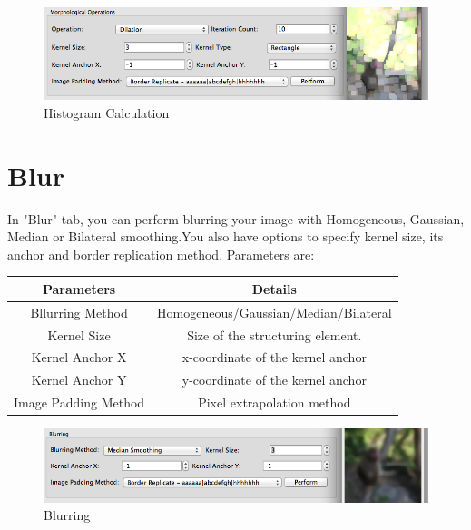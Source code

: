 \documentclass{article}
\begin{document}
\begin{figure}[H]
\begin{center}
\includegraphics[scale=0.5]{toolboxMorph.png}
\caption{Histogram Calculation}
\end{center}
\end{figure}	

\section{Blur}

In "Blur" tab, you can perform blurring your image with Homogeneous, Gaussian, Median or Bilateral smoothing.You also have options to specify kernel size, its anchor and border replication method. Parameters are:

\begin{table}[H]
\begin{center}
\begin{tabular}{|c|c|l|l|l|}
\hline
\textbf{Parameters}  & \multicolumn{4}{|c|}{\textbf{Details}}                                                          \\ \hline
Bllurring Method            & \multicolumn{4}{|c|}{Homogeneous/Gaussian/Median/Bilateral} \\ \hline
Kernel Size          & \multicolumn{4}{|c|}{Size of the structuring element.}                                          \\ \hline
Kernel Anchor X      & \multicolumn{4}{|c|}{x-coordinate of the kernel anchor}                                         \\ \hline
Kernel Anchor Y      & \multicolumn{4}{|c|}{y-coordinate of the kernel anchor}                                         \\ \hline
Image Padding Method & \multicolumn{4}{|c|}{Pixel extrapolation method}                                                \\ \hline
\end{tabular}
\end{center}
\end{table}

\begin{figure}[H]
\begin{center}
\includegraphics[scale=0.5]{toolboxBlur.png}
\caption{Blurring}
\end{center}
\end{figure}	
\end{document}
